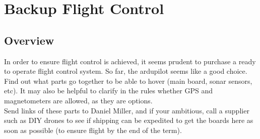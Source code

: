\documentclass[12pt,letterpaper]{article}
\begin{document}
\section{Backup Flight Control}
\subsection{Overview}
In order to ensure flight control is achieved, it seems prudent to purchase
a ready to operate flight control system. So far, the ardupilot seems like
a good choice. Find out what parts go together to be able to hover (main board,
sonar sensors, etc). It may also be helpful to clarify in the rules whether
GPS and magnetometers are allowed, as they are options.\\
Send links of these parts to Daniel Miller, and if your ambitious, call a
supplier such as DIY drones to see if shipping can be expedited to get the
boards here as soon as possible (to ensure flight by the end of the term).
\end{document}
